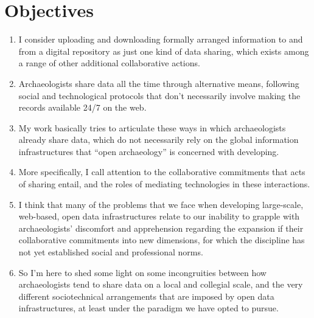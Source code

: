 \documentclass{article}
\begin{document}
\section{Objectives}
\begin{enumerate}
  \item I consider uploading and downloading formally arranged information to and from a digital repository as just one kind of data sharing, which exists among a range of other additional collaborative actions.
  \item Archaeologists share data all the time through alternative means, following social and technological protocols that don't necessarily involve making the records available 24/7 on the web.
  \item My work basically tries to articulate these ways in which archaeologists already share data, which do not necessarily rely on the global information infrastructures that ``open archaeology'' is concerned with developing.
  \item More specifically, I call attention to the collaborative commitments that acts of sharing entail, and the roles of mediating technologies in these interactions.
  \item I think that many of the problems that we face when developing large-scale, web-based, open data infrastructures relate to our inability to grapple with archaeologists' discomfort and apprehension regarding the expansion if their collaborative commitments into new dimensions, for which the discipline has not yet established social and professional norms.
  \item So I'm here to shed some light on some incongruities between how archaeologists tend to share data on a local and collegial scale, and the very different sociotechnical arrangements that are imposed by open data infrastructures, at least under the paradigm we have opted to pursue.
\end{enumerate}
\end{document}
